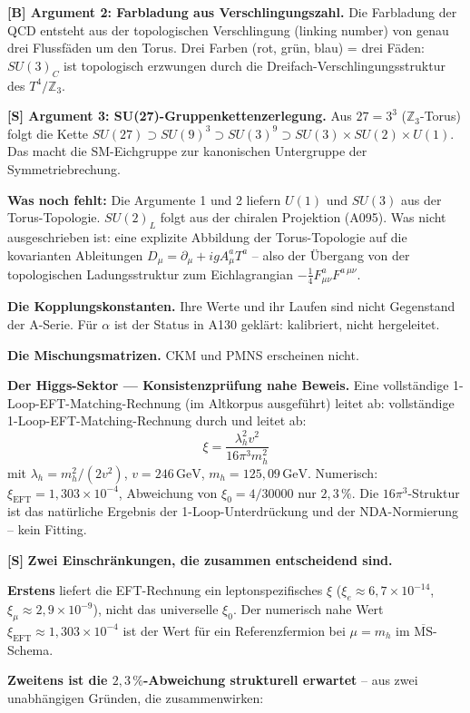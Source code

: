 \textbf{[B] Argument 2: Farbladung aus Verschlingungszahl.}
Die Farbladung der QCD entsteht aus der topologischen Verschlingung
(linking number) von genau drei Flussfäden um den Torus. Drei Farben
(rot, grün, blau) = drei Fäden: $SU(3)_C$ ist topologisch erzwungen
durch die Dreifach-Verschlingungsstruktur des $T^4/\mathbb{Z}_3$.

\textbf{[S] Argument 3: SU(27)-Gruppenkettenzerlegung.}
Aus $27=3^3$ ($\mathbb{Z}_3$-Torus) folgt die Kette
$SU(27)\supset SU(9)^3\supset SU(3)^9\supset SU(3)\times SU(2)\times U(1)$.
Das macht die SM-Eichgruppe zur kanonischen Untergruppe der Symmetriebrechung.

\textbf{Was noch fehlt:} Die Argumente 1 und 2 liefern $U(1)$ und $SU(3)$
aus der Torus-Topologie. $SU(2)_L$ folgt aus der chiralen Projektion (A095).
Was nicht ausgeschrieben ist: eine explizite Abbildung der Torus-Topologie
auf die kovarianten Ableitungen $D_\mu = \partial_\mu + igA_\mu^a T^a$ --
also der Übergang von der topologischen Ladungsstruktur zum Eichlagrangian
$-\tfrac14 F_{\mu\nu}^a F^{a\,\mu\nu}$.

\textbf{Die Kopplungskonstanten.} Ihre Werte und ihr Laufen sind nicht
Gegenstand der A-Serie. Für $\alpha$ ist der Status in A130 geklärt:
kalibriert, nicht hergeleitet.

\textbf{Die Mischungsmatrizen.} CKM und PMNS erscheinen nicht.

\textbf{Der Higgs-Sektor — Konsistenzprüfung nahe Beweis.} Eine vollständige 1-Loop-EFT-Matching-Rechnung (im Altkorpus ausgeführt) leitet ab:
vollständige 1-Loop-EFT-Matching-Rechnung durch und leitet ab:
\[
  \xi = \frac{\lambda_h^2 v^2}{16\pi^3 m_h^2}
\]
mit $\lambda_h=m_h^2/(2v^2)$, $v=246\,\text{GeV}$, $m_h=125{,}09\,\text{GeV}$.
Numerisch: $\xi_\text{EFT}=1{,}303\times10^{-4}$, Abweichung von $\xi_0=4/30000$
nur $2{,}3\,\%$. Die $16\pi^3$-Struktur ist das natürliche Ergebnis der
1-Loop-Unterdrückung und der NDA-Normierung -- kein Fitting.

\textbf{[S]} \textbf{Zwei Einschränkungen, die zusammen entscheidend sind.}

\textbf{Erstens} liefert die EFT-Rechnung ein leptonspezifisches $\xi$
($\xi_e\approx6{,}7\times10^{-14}$, $\xi_\mu\approx2{,}9\times10^{-9}$),
nicht das universelle $\xi_0$. Der numerisch nahe Wert
$\xi_\text{EFT}\approx1{,}303\times10^{-4}$ ist der Wert für ein Referenzfermion
bei $\mu=m_h$ im $\overline{\text{MS}}$-Schema.

\textbf{Zweitens ist die $2{,}3\,\%$-Abweichung strukturell erwartet} -- aus
zwei unabhängigen Gründen, die zusammenwirken:

